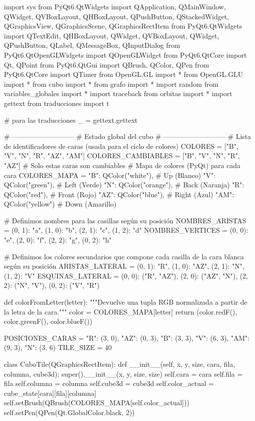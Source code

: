 import sys
from PyQt6.QtWidgets import QApplication, QMainWindow, QWidget, QVBoxLayout, QHBoxLayout,  QPushButton, QStackedWidget, QGraphicsView, QGraphicsScene, QGraphicsRectItem
from PyQt6.QtWidgets import QTextEdit, QHBoxLayout, QWidget, QVBoxLayout, QWidget, QPushButton, QLabel, QMessageBox, QInputDialog
from PyQt6.QtOpenGLWidgets import QOpenGLWidget
from PyQt6.QtCore import Qt, QPoint
from PyQt6.QtGui import QBrush, QColor, QPen
from PyQt6.QtCore import QTimer
from OpenGL.GL import *
from OpenGL.GLU import *
from cubo import *
from grafo import *
import random
from variables_globales import *
import traceback
from orbitas import *
import gettext
from traducciones import t

# para las traducciones
_ = gettext.gettext

# ---------------------------
# Estado global del cubo
# ---------------------------
# Lista de identificadores de caras (usada para el ciclo de colores)
COLORES = ["B", "V", "N", "R", "AZ", "AM"]
COLORES_CAMBIABLES = ["B", "V", "N", "R", "AZ"]  # Solo estas caras son cambiables
# Mapa de colores (PyQt) para cada cara
COLORES_MAPA = {
    "B": QColor("white"),   # Up (Blanco)
    "V": QColor("green"),   # Left (Verde)
    "N": QColor("orange"),  # Back (Naranja)
    "R": QColor("red"),     # Front (Rojo)
    "AZ": QColor("blue"),   # Right (Azul)
    "AM": QColor("yellow")   # Down (Amarillo)
}

# Definimos nombres para las casillas según su posición
NOMBRES_ARISTAS = {(0, 1): "a", (1, 0): "b", (2, 1): "c", (1, 2): "d"}
NOMBRES_VERTICES = {(0, 0): "e", (2, 0): "f", (2, 2): "g", (0, 2): "h"}

# Definimos los colores secundarios que compone cada casilla de la cara blanca según su posición
ARISTAS_LATERAL = {(0, 1): "R", (1, 0): "AZ", (2, 1): "N", (1, 2): "V"}
ESQUINAS_LATERAL = {(0, 0): ("R", "AZ"), (2, 0): ("AZ", "N"), (2, 2): ("N", "V"), (0, 2): ("V", "R")}

def colorFromLetter(letter):
    """Devuelve una tupla RGB normalizada a partir de la letra de la cara."""
    color = COLORES_MAPA[letter]
    return (color.redF(), color.greenF(), color.blueF())

POSICIONES_CARAS = {
    "R":  (3, 0),
    "AZ":  (0, 3),
    "B":  (3, 3),
    "V":  (6, 3),
    "AM": (9, 3),
    "N": (3, 6)
}
TILE_SIZE = 40

class CuboTile(QGraphicsRectItem):
    def __init__(self, x, y, size, cara, fila, columna, cube3d):
        super().__init__(x, y, size, size)
        self.cara = cara
        self.fila = fila
        self.columna = columna
        self.cube3d = cube3d
        self.color_actual = cube_state[cara][fila][columna]
        self.setBrush(QBrush(COLORES_MAPA[self.color_actual]))
        self.setPen(QPen(Qt.GlobalColor.black, 2))
       

